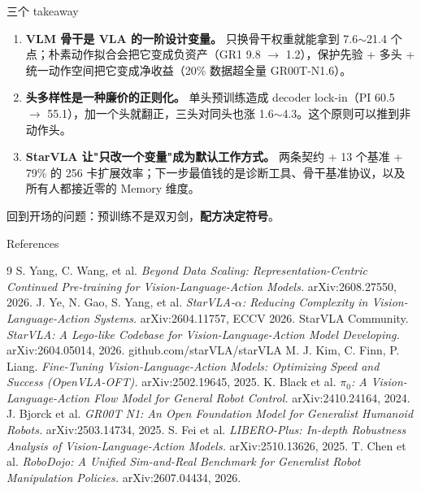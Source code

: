 \documentclass[aspectratio=169,10pt]{beamer}
\begin{document}
\begin{frame}{三个 takeaway}
  \begin{enumerate}
    \item \textbf{VLM 骨干是 VLA 的一阶设计变量。} 只换骨干权重就能拿到 7.6$\sim$21.4 个点；朴素动作拟合会把它变成负资产（GR1 9.8 $\to$ 1.2），保护先验 + 多头 + 统一动作空间把它变成净收益（20\% 数据超全量 GR00T-N1.6）。
    \vspace{6pt}
    \item \textbf{头多样性是一种廉价的正则化。} 单头预训练造成 decoder lock-in（PI 60.5 $\to$ 55.1），加一个头就翻正，三头对同头也涨 1.6$\sim$4.3。这个原则可以推到非动作头。
    \vspace{6pt}
    \item \textbf{StarVLA 让"只改一个变量"成为默认工作方式。} 两条契约 + 13 个基准 + 79\% 的 256 卡扩展效率；下一步最值钱的是诊断工具、骨干基准协议，以及所有人都接近零的 Memory 维度。
  \end{enumerate}
  \vspace{8pt}
  \begin{center}
    \small 回到开场的问题：预训练不是双刃剑，\textbf{配方决定符号}。
  \end{center}
\end{frame}

\begin{frame}{References}
  \small
  \begin{thebibliography}{9}
     S. Yang, C. Wang, et al. \emph{Beyond Data Scaling: Representation-Centric Continued Pre-training for Vision-Language-Action Models.} arXiv:2608.27550, 2026.
     J. Ye, N. Gao, S. Yang, et al. \emph{StarVLA-$\alpha$: Reducing Complexity in Vision-Language-Action Systems.} arXiv:2604.11757, ECCV 2026.
     StarVLA Community. \emph{StarVLA: A Lego-like Codebase for Vision-Language-Action Model Developing.} arXiv:2604.05014, 2026. github.com/starVLA/starVLA
     M. J. Kim, C. Finn, P. Liang. \emph{Fine-Tuning Vision-Language-Action Models: Optimizing Speed and Success (OpenVLA-OFT).} arXiv:2502.19645, 2025.
     K. Black et al. \emph{$\pi_0$: A Vision-Language-Action Flow Model for General Robot Control.} arXiv:2410.24164, 2024.
     J. Bjorck et al. \emph{GR00T N1: An Open Foundation Model for Generalist Humanoid Robots.} arXiv:2503.14734, 2025.
     S. Fei et al. \emph{LIBERO-Plus: In-depth Robustness Analysis of Vision-Language-Action Models.} arXiv:2510.13626, 2025.
     T. Chen et al. \emph{RoboDojo: A Unified Sim-and-Real Benchmark for Generalist Robot Manipulation Policies.} arXiv:2607.04434, 2026.
  \end{thebibliography}
\end{frame}
\end{document}
